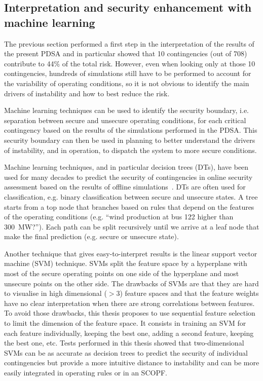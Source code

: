 \subsection{Interpretation and security enhancement with machine learning}
\label{sec:PDSA_ML}

The previous section performed a first step in the interpretation of the results of the present PDSA and in particular showed that 10 contingencies (out of 708) contribute to 44\% of the total risk. However, even when looking only at those 10 contingencies, hundreds of simulations still have to be performed to account for the variability of operating conditions, so it is not obvious to identify the main drivers of instability and how to best reduce the risk.


Machine learning techniques can be used to identify the security boundary, i.e. separation between secure and unsecure operating conditions, for each critical contingency based on the results of the simulations performed in the PDSA. This security boundary can then be used in planning to better understand the drivers of instability, and in operation, to dispatch the system to more secure conditions.

Machine learning techniques, and in particular decision trees (DTs), have been used for many decades to predict the security of contingencies in online security assessment based on the results of offline simulations~\cite{DT_Wehenkel}. DTs are often used for classification, e.g. binary classification between secure and unsecure states. A tree starts from a top node that branches based on rules that depend on the features of the operating conditions (e.g. ``wind production at bus 122 higher than 300~MW?''). Each path can be split recursively until we arrive at a leaf node that make the final prediction (e.g. secure or unsecure state).

Another technique that gives easy-to-interpret results is the linear support vector machine (SVM) technique. SVMs split the feature space by a hyperplane with most of the secure operating points on one side of the hyperplane and most unsecure points on the other side. The drawbacks of SVMs are that they are hard to visualise in high dimensional (\(>3\)) feature spaces and that the feature weights have no clear interpretation when there are strong correlations between features. To avoid those drawbacks, this thesis proposes to use sequential feature selection to limit the dimension of the feature space. It consists in training an SVM for each feature individually, keeping the best one, adding a second feature, keeping the best one, etc. Tests performed in this thesis showed that two-dimensional SVMs can be as accurate as decision trees to predict the security of individual contingencies but provide a more intuitive distance to instability and can be more easily integrated in operating rules or in an SCOPF.

